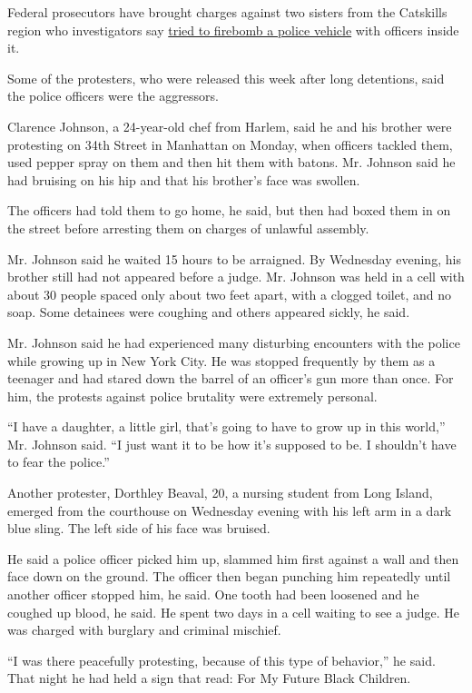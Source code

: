 Federal prosecutors have brought charges against two sisters from the
Catskills region who investigators say
\href{https://www.nytimes3xbfgragh.onion/aponline/2020/06/01/us/ap-us-america-protests-firebombing-charges.html}{tried
to firebomb a police vehicle} with officers inside it.

Some of the protesters, who were released this week after long
detentions, said the police officers were the aggressors.

Clarence Johnson, a 24-year-old chef from Harlem, said he and his
brother were protesting on 34th Street in Manhattan on Monday, when
officers tackled them, used pepper spray on them and then hit them with
batons. Mr. Johnson said he had bruising on his hip and that his
brother's face was swollen.

The officers had told them to go home, he said, but then had boxed them
in on the street before arresting them on charges of unlawful assembly.

Mr. Johnson said he waited 15 hours to be arraigned. By Wednesday
evening, his brother still had not appeared before a judge. Mr. Johnson
was held in a cell with about 30 people spaced only about two feet
apart, with a clogged toilet, and no soap. Some detainees were coughing
and others appeared sickly, he said.

Mr. Johnson said he had experienced many disturbing encounters with the
police while growing up in New York City. He was stopped frequently by
them as a teenager and had stared down the barrel of an officer's gun
more than once. For him, the protests against police brutality were
extremely personal.

``I have a daughter, a little girl, that's going to have to grow up in
this world,'' Mr. Johnson said. ``I just want it to be how it's supposed
to be. I shouldn't have to fear the police.''

Another protester, Dorthley Beaval, 20, a nursing student from Long
Island, emerged from the courthouse on Wednesday evening with his left
arm in a dark blue sling. The left side of his face was bruised.

He said a police officer picked him up, slammed him first against a wall
and then face down on the ground. The officer then began punching him
repeatedly until another officer stopped him, he said. One tooth had
been loosened and he coughed up blood, he said. He spent two days in a
cell waiting to see a judge. He was charged with burglary and criminal
mischief.

``I was there peacefully protesting, because of this type of behavior,''
he said. That night he had held a sign that read: For My Future Black
Children.


